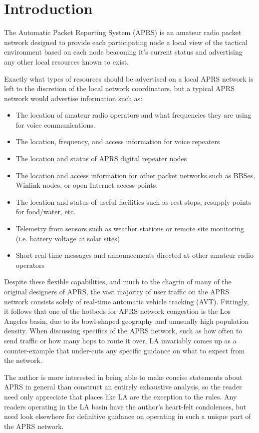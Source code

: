 

\chapter{Introduction}

The Automatic Packet Reporting System (APRS) is an amateur radio packet
network designed to provide each participating node a local view of the 
tactical environment based on each node beaconing it's current status
and advertising any other local resources known to exist.

Exactly what types of resources should be advertised on a local APRS
network is left to the discretion of the local network coordinators, but
a typical APRS network would advertise information such as:
\begin{itemize}
\item The location of amateur radio operators and what frequencies they are using for voice communications.
\item The location, frequency, and access information for voice repeaters
\item The location and status of APRS digital repeater nodes
\item The location and access information for other packet networks such as BBSes, Winlink nodes, or open Internet access points.
\item The location and status of useful facilities such as rest stops, resupply points for food/water, etc.
\item Telemetry from sensors such as weather stations or remote site monitoring (i.e. battery voltage at solar sites)
\item Short real-time messages and announcements directed at other amateur radio operators
\end{itemize} 

Despite these flexible capabilities, 
and much to the chagrin of many of the original designers of APRS, 
the vast majority of user traffic on the APRS network consists solely of 
real-time automatic vehicle tracking (AVT).
Fittingly, it follows that one of the hotbeds for APRS network congestion
is the Los Angeles basin, 
due to its bowl-shaped geography and unusually high population density.
When discussing specifics of the APRS network, such as how often to send traffic
or how many hops to route it over, LA invariably comes up as a counter-example
that under-cuts any specific guidance on what to expect from the network.

The author is more interested in being able to make concise statements about 
APRS in general than construct an entirely exhaustive analysis, 
so the reader need only appreciate that places like LA are the exception to the rules.
Any readers operating in the LA basin have the author's heart-felt condolences,
but need look elsewhere for definitive guidance on operating in such a unique
part of the APRS network.

